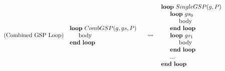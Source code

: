 %
\noindent\begin{minipage}{\linewidth}
\begin{align}
  \tag{Combined GSP Loop}
  \begin{minipage}[]{0.4\textwidth}
  \begin{algorithmic}
    \Loop\ $CombGSP(g, gs, P)$
      \State body
    \EndLoop
  \end{algorithmic}
  \end{minipage}
  &\leadsto
  \begin{minipage}[]{0.4\textwidth}
  \begin{algorithmic}
    \Loop\ $SingleGSP(g, P)$
      \Loop\ $gs_0$
        \State body
      \EndLoop
      \Loop\ $gs_1$
        \State body
      \EndLoop
      \State ...
    \EndLoop
  \end{algorithmic}
  \end{minipage}
\end{align}
\end{minipage}


